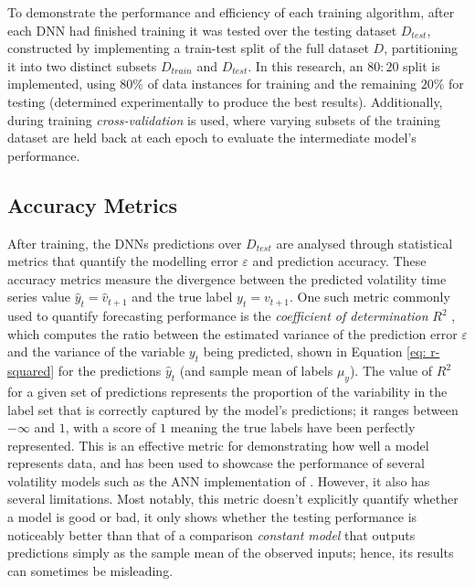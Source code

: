 \documentclass[a4paper, 11pt]{report}
\begin{document}
    To demonstrate the performance and efficiency of each training algorithm, after each DNN had finished training it was tested over the testing dataset $D_{test}$, constructed by implementing a train-test split of the full dataset $D$, partitioning it into two distinct subsets $D_{train}$ and $D_{test}$. In this research, an $80 \colon 20$ split is implemented, using $80\%$ of data instances for training and the remaining $20\%$ for testing (determined experimentally to produce the best results). Additionally, during training \emph{cross-validation} is used, where varying subsets of the training dataset are held back at each epoch to evaluate the intermediate model's performance.




    \subsection{Accuracy Metrics}
    \label{section: accuracy-metrics}

    After training, the DNNs predictions over $D_{test}$ are analysed through statistical metrics that quantify the modelling error $\varepsilon$ and prediction accuracy. These accuracy metrics measure the divergence between the predicted volatility time series value $\hat{y}_t = \hat{v}_{t+1}$ and the true label $y_t = v_{t+1}$. One such metric commonly used to quantify forecasting performance is the \emph{coefficient of determination} $R^2$ \citep{zhang-2022}, which computes the ratio between the estimated variance of the prediction error $\varepsilon$ and the variance of the variable $y_t$ being predicted, shown in Equation \ref{eq: r-squared} for the predictions $\hat{y}_t$ (and sample mean of labels $\mu_{y}$). The value of $R^2$ for a given set of predictions represents the proportion of the variability in the label set that is correctly captured by the model's predictions; it ranges between $- \infty$ and $1$, with a score of $1$ meaning the true labels have been perfectly represented. This is an effective metric for demonstrating how well a model represents data, and has been used to showcase the performance of several volatility models such as the ANN implementation of \citet{zhang-2022}. However, it also has several limitations. Most notably, this metric doesn't explicitly quantify whether a model is good or bad, it only shows whether the testing performance is noticeably better than that of a comparison \emph{constant model} that outputs predictions simply as the sample mean of the observed inputs; hence, its results can sometimes be misleading.
\end{document}
